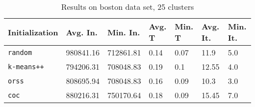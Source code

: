 \begin{table}[h]
	\begin{center}
		\begin{tabular}{|l|l|l|l|l|l|l|}
			\hline
			Initialization & Avg. In. & Min. In. & Avg. T & Min. T & Avg. It. & Min. It.\\\hline
			\texttt{random} & 980841.16 & 712861.81 & 0.14 & 0.07 & 11.9 & 5.0\\\hline
			\texttt{k-means++} & 794206.31 & 708048.83 & 0.19 & 0.1 & 12.55 & 4.0\\\hline
			\texttt{orss} & 808695.94 & 708048.83 & 0.16 & 0.09 & 10.3 & 3.0\\\hline
			\texttt{coc} & 880216.31 & 750170.64 & 0.18 & 0.09 & 15.45 & 7.0\\\hline
		\end{tabular}
		\caption{Results on boston data set, 25 clusters}
		\label{tbl:boston25}
	\end{center}
\end{table}

